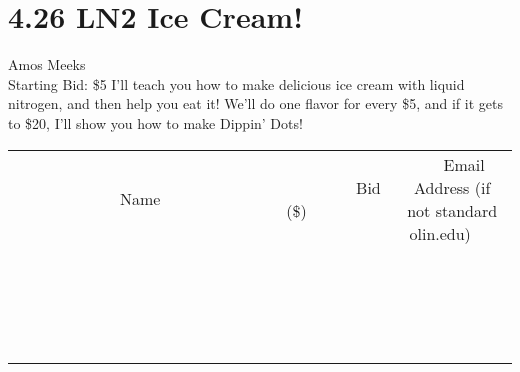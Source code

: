 \documentclass[11pt]{article}
\begin{document}
\section*{4.26 LN2 Ice Cream!}
Amos Meeks
\\
Starting Bid: \$5
\newline
I'll teach you how to make delicious ice cream with liquid nitrogen, and then help you eat it! We'll do one flavor for every \$5, and if it gets to \$20, I'll show you how to make Dippin' Dots!
\\[3ex]
\begin{tabular}{c c c}
~~~~~~~~~~~~~Name~~~~~~~~~~~~~ & ~~~~~~~~~Bid (\$)~~~~~~~~~  & ~~~Email Address (if not standard olin.edu)~~~\\
 & & \\
\hline
 & & \\
\hline
 & & \\
\hline
 & & \\
\hline
 & & \\
\hline
 & & \\
\hline
 & & \\
\hline
 & & \\
\hline
 & & \\
\hline
 & & \\
\hline
 & & \\
\hline
 & & \\
\hline
 & & \\
\hline
 & & \\
\hline
 & & \\
\hline
 & & \\
\hline
 & & \\
\hline
 & & \\
\hline
 & & \\
\hline
\end{tabular}
\newpage
\end{document}
